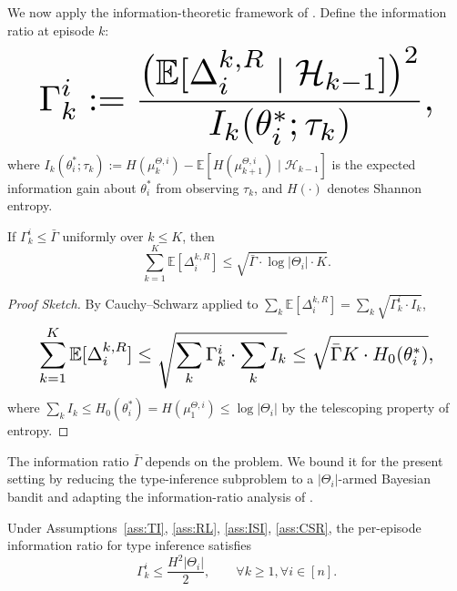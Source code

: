 We now apply the information-theoretic framework of \citet{russo2016information}. Define the information ratio at episode $k$:
\begin{equation}\resizebox{0.9\linewidth}{!}{$\displaystyle \Gamma_k^i := \frac{\big(\mathbb{E}[\Delta_i^{k,R} \mid \mathcal{H}_{k-1}]\big)^2}{I_k(\theta_i^*; \tau_k)}, $}\end{equation}
where $I_k(\theta_i^*; \tau_k) := H(\mu_k^{\Theta,i}) - \mathbb{E}[H(\mu_{k+1}^{\Theta,i}) \mid \mathcal{H}_{k-1}]$ is the expected information gain about $\theta_i^*$ from observing $\tau_k$, and $H(\cdot)$ denotes Shannon entropy.

\begin{proposition}
\label{prop:type-bound}
If $\Gamma_k^i \leq \bar{\Gamma}$ uniformly over $k \leq K$, then
\begin{equation}
\label{eq:type-bound}
\sum_{k=1}^K \mathbb{E}[\Delta_i^{k,R}] \leq \sqrt{\bar{\Gamma} \cdot \log|\Theta_i| \cdot K}.
\end{equation}
\end{proposition}

\begin{proof}[Proof Sketch]
By Cauchy--Schwarz applied to $\sum_k \mathbb{E}[\Delta_i^{k,R}] = \sum_k \sqrt{\Gamma_k^i \cdot I_k}$,
\begin{equation}\resizebox{0.9\linewidth}{!}{$\displaystyle \sum_{k=1}^K \mathbb{E}[\Delta_i^{k,R}] \leq \sqrt{\sum_k \Gamma_k^i \cdot \sum_k I_k} \leq \sqrt{\bar{\Gamma} K \cdot H_0(\theta_i^*)}, $}\end{equation}
where $\sum_k I_k \leq H_0(\theta_i^*) = H(\mu_1^{\Theta,i}) \leq \log|\Theta_i|$ by the telescoping property of entropy.
\end{proof}

The information ratio $\bar{\Gamma}$ depends on the problem. We bound it for the present setting by reducing the type-inference subproblem to a $|\Theta_i|$-armed Bayesian bandit and adapting the information-ratio analysis of \citet{russo2016information}.

\begin{lemma}
\label{lem:info-ratio}
Under Assumptions~\ref{ass:TI}, \ref{ass:RL}, \ref{ass:ISI}, \ref{ass:CSR}, the per-episode information ratio for type inference satisfies
\begin{equation}
\Gamma_k^i \leq \frac{H^2 |\Theta_i|}{2}, \qquad \forall k \geq 1, \forall i \in [n].
\end{equation}
\end{lemma}

